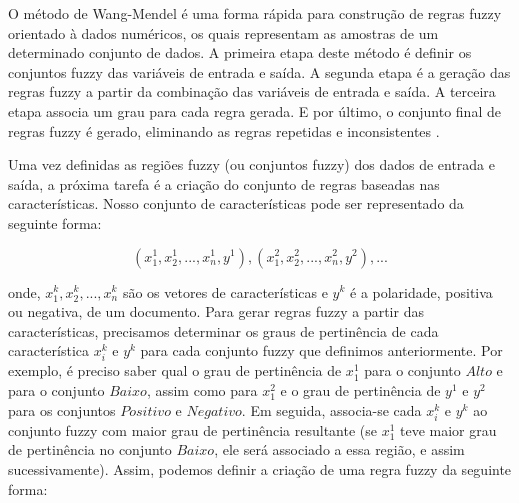 O método de Wang-Mendel é uma forma rápida para construção de regras fuzzy orientado à dados numéricos, os quais representam as amostras de um determinado conjunto de dados. A primeira etapa deste método é definir os conjuntos fuzzy das variáveis de entrada e saída. A segunda etapa é a geração das regras fuzzy a partir da combinação das variáveis de entrada e saída. A terceira etapa associa um grau para cada regra gerada. E por último, o conjunto final de regras fuzzy é gerado, eliminando as regras repetidas e inconsistentes \cite{wang1992generating}.


Uma vez definidas as regiões fuzzy (ou conjuntos fuzzy) dos dados de entrada e saída, a próxima tarefa é a criação do conjunto de regras baseadas nas características. Nosso conjunto de características pode ser representado da seguinte forma:

\begin{equation}
( x_1^1, x_2^1, ... , x_n^1, y^1), ( x_1^2, x_2^2, ... , x_n^2, y^2), ...
\label{eq:repr_feat}
\end{equation}

onde, $x_1^k, x_2^k, ... , x_n^k$ são os vetores de características e $y^k$ é a polaridade, positiva ou negativa, de um documento. Para gerar regras fuzzy a partir das  características, precisamos determinar os graus de pertinência de cada característica $x_i^k$ e $y^k$ para cada conjunto fuzzy que definimos anteriormente. Por exemplo, é preciso saber qual o grau de pertinência de $x_1^1$ para o conjunto $Alto$ e para o conjunto $Baixo$, assim como para $x_1^2$ e o grau de pertinência de $y^1$ e $y^2$ para os conjuntos $Positivo$ e $Negativo$. Em seguida, associa-se cada $x_i^k$ e $y^k$ ao conjunto fuzzy com maior grau de pertinência resultante (se $x_1^1$ teve maior grau de pertinência no conjunto $Baixo$, ele será associado a essa região, e assim sucessivamente). Assim, podemos definir a criação de uma regra fuzzy da seguinte forma:

